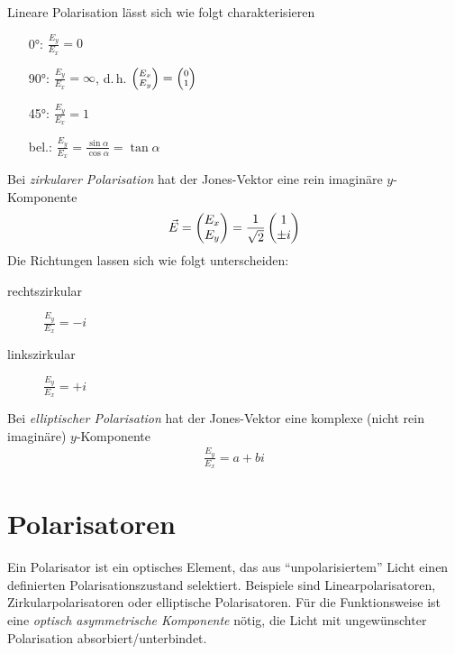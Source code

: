 Lineare Polarisation lässt sich wie folgt charakterisieren
\begin{itemize}
\item[\ang{0}:] $\frac{E_y}{E_x} = 0$
\item[\ang{90}:] $\frac{E_y}{E_x} = \infty$, d.\,h.
$\scriptsize\begin{pmatrix}E_x\\E_y\end{pmatrix}
= \begin{pmatrix}0\\1\end{pmatrix}$
\item[\ang{45}:] $\frac{E_y}{E_x} = 1$
\item[bel.:] 
  $\frac{E_y}{E_x} = \frac{\sin\alpha}{\cos\alpha} = \tan\alpha$
\end{itemize}

Bei \emph{zirkularer Polarisation}
hat der Jones-Vektor eine rein imaginäre
$y$-Komponente
\begin{gather*}
  \vec{E} = \begin{pmatrix}E_x\\E_y\end{pmatrix} 
  = \frac{1}{\sqrt{2}}\begin{pmatrix}1\\\pm i\end{pmatrix}
\end{gather*}
Die Richtungen lassen sich wie folgt unterscheiden:
\begin{description}
\item[rechtszirkular] $\frac{E_y}{E_x}=-i$
\item[linkszirkular] $\frac{E_y}{E_x}=+i$
\end{description}

Bei \emph{elliptischer Polarisation}
hat der Jones-Vektor eine komplexe (nicht rein imaginäre)
$y$-Komponente
\begin{gather*}
  \frac{E_y}{E_x} = a+bi
\end{gather*}


\section{Polarisatoren}
Ein Polarisator ist ein optisches Element,
das aus \enquote{unpolarisiertem} Licht einen definierten
Polarisationszustand selektiert.
Beispiele sind Linearpolarisatoren, Zirkularpolarisatoren oder
elliptische Polarisatoren.
Für die Funktionsweise ist eine \emph{optisch asymmetrische
  Komponente} nötig,
die Licht mit ungewünschter Polarisation absorbiert/unterbindet.

